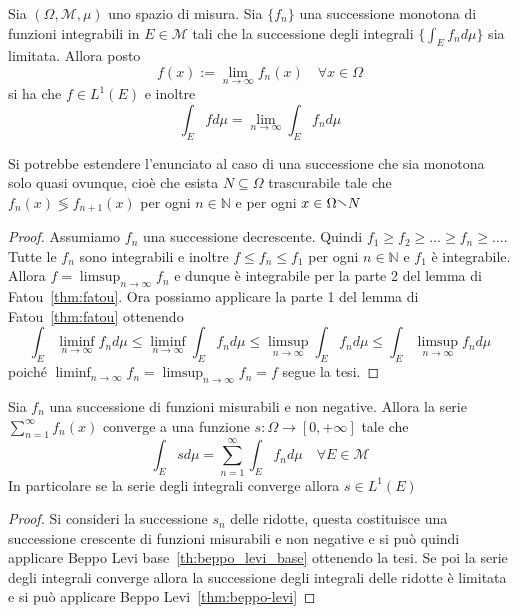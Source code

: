 \begin{theorem}\label{thm:beppo-levi}
    Sia \({(\Omega, \mathcal{M}, \mu)}\) uno spazio di misura. Sia \(\{f_{n}\}
    \) una successione monotona di funzioni integrabili in \(E \in \mathcal{M}\)  tali che la successione
    degli integrali \(\displaystyle \{\int_E f_{n} d\mu\} \) sia limitata.
    Allora posto
    \[
        f{(x)} := \lim_{n \to \infty} f_{n}{(x)} \quad \forall x \in \Omega
    \]
    si ha che \(f \in L^{1}{(E)}\) e inoltre
    \[
        \int_E f d\mu = \lim_{n \to \infty} \int_E f_{n} d\mu 
    \]
\end{theorem}
\begin{remark}
    Si potrebbe estendere l'enunciato al caso di una successione che sia
    monotona solo quasi ovunque, cioè che esista \(N \subseteq \Omega \) trascurabile
    tale che \(f_{n}{(x)} \lessgtr f_{n+1}{(x)} \) per ogni \(n \in \mathbb{N}\)
    e per ogni \(x \in \Omega \sminus N\)
\end{remark}
\begin{proof}
    Assumiamo \(f_{n}\) una successione decrescente. Quindi \(f_{1} \ge f_{2}
    \ge \dots\ge f_{n}\ge \dots\). 
    Tutte le \(f_{n}\) sono integrabili e inoltre \(f \le f_{n} \le f_{1}\) per ogni
    \(n \in \mathbb{N}\) e \(f_{1}\) è integrabile.
    Allora \(f = \limsup_{n \to \infty} f_{n}\) e dunque è integrabile per la
    parte 2 del lemma di Fatou~\ref{thm:fatou}.
    Ora possiamo applicare la parte 1 del lemma di Fatou~\ref{thm:fatou} ottenendo
    \[
        \int_E \liminf_{n \to \infty} f_{n} d\mu \le \liminf_{n
        \to \infty} \int_E f_{n} d\mu \le \limsup_{n \to \infty} \int_E f_{n}
        d\mu \le  \int_E \limsup_{n \to \infty} f_{n} d\mu
    \]
    poiché \(\displaystyle \liminf_{n \to \infty} f_{n} = \limsup_{n \to \infty}
    f_{n} = f\) segue la tesi.
\end{proof}
\begin{corollary}
    Sia \(f_{n}\) una successione di funzioni misurabili e non negative. Allora
    la serie \(\sum_{n=1}^{\infty} f_{n}{(x)} \) converge a una funzione \(s:
    \Omega \to [0, +\infty]\) tale che
    \[
        \int_E s d\mu = \sum_{n=1}^{\infty} \int_E f_{n} d\mu \quad \forall E
        \in \mathcal{M} 
    \]
    In particolare se la serie degli integrali converge allora \(s \in L^{1}{(E)}\) 
\end{corollary}
\begin{proof}
    Si consideri la successione \(s_{n}\) delle ridotte, questa costituisce una
    successione crescente di funzioni misurabili e non negative e si può quindi
    applicare Beppo Levi base~\ref{th:beppo_levi_base} ottenendo la tesi. Se poi
    la serie degli integrali converge allora la successione degli integrali
    delle ridotte è limitata e si può applicare Beppo Levi~\ref{thm:beppo-levi}
\end{proof}

